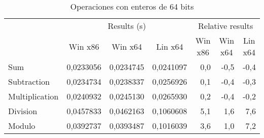 \begin{table}[h]
\centering
\begin{tabular}{@{}l|rrr|rrr|@{}}
\cmidrule(l){2-7}
                                     & \multicolumn{3}{c|}{Results (s)}                                                               & \multicolumn{3}{c|}{Relative results}                                                      \\ \cmidrule(l){2-7} 
                                     & \multicolumn{1}{c|}{Win x86} & \multicolumn{1}{c|}{Win x64} & \multicolumn{1}{c|}{Lin x64} & \multicolumn{1}{c|}{Win x86} & \multicolumn{1}{c|}{Win x64} & \multicolumn{1}{c|}{Lin x64} \\ \midrule
\multicolumn{1}{|l|}{Sum}            & 0,0233056                    & 0,0234745                    & 0,0241097                    & 0,0                          & -0,5                         & -0,4                         \\ \cmidrule(r){1-1}
\multicolumn{1}{|l|}{Subtraction}    & 0,0234734                    & 0,0238337                    & 0,0256926                    & 0,1                          & -0,4                         & -0,3                         \\ \cmidrule(r){1-1}
\multicolumn{1}{|l|}{Multiplication} & 0,0240932                    & 0,0245130                    & 0,0265930                    & 0,2                          & -0,4                         & -0,2                         \\ \cmidrule(r){1-1}
\multicolumn{1}{|l|}{Division}       & 0,0457833                    & 0,0462163                    & 0,1060608                    & 5,1                          & 1,6                          & 7,6                          \\ \cmidrule(r){1-1}
\multicolumn{1}{|l|}{Modulo}         & 0,0392737                    & 0,0393487                    & 0,1016039                    & 3,6                          & 1,0                          & 7,2                          \\ \bottomrule
\end{tabular}
\caption{Operaciones con enteros de 64 bits}
\end{table}

